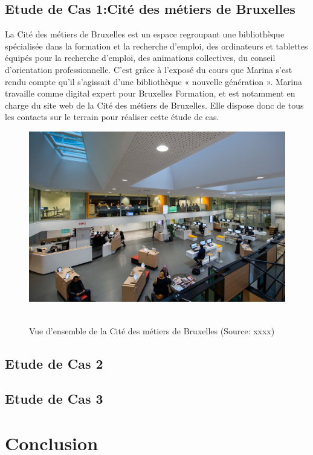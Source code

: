 \documentclass[french,a4paper,12pt]{article}
\begin{document}
\subsection{Etude de Cas 1:Cité des métiers de Bruxelles }
\quad La Cité des métiers de Bruxelles est un espace regroupant une bibliothèque spécialisée dans la formation et la recherche d’emploi, des ordinateurs et tablettes équipés pour la recherche d’emploi, des animations collectives, du conseil d’orientation professionnelle. C’est grâce à l’exposé du cours que Marina s’est rendu compte qu’il s’agissait d’une bibliothèque « nouvelle génération ». Marina travaille comme digital expert pour Bruxelles Formation, et est notamment en charge du site web de la Cité des métiers de Bruxelles. Elle dispose donc de tous les contacts sur le terrain pour réaliser cette étude de cas.
\begin{figure}[h]
\begin{center}
\includegraphics[scale=1]{imarina.JPG}~\\
\caption{Vue d'ensemble de la Cité des métiers de Bruxelles (Source: xxxx)}
\end{center}
\end{figure}


\newpage
\subsection{Etude de Cas 2}


\newpage
\subsection{Etude de Cas 3}

\newpage
\section{Conclusion}






\newpage
\begin{center}
\listoffigures
\end{center}

\newpage

\begin{center}

 
\end{center}
\end{document}
